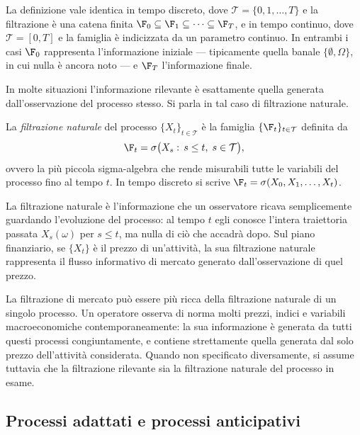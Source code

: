 La definizione vale identica in tempo discreto, dove
$\mathcal{T}=\{0,1,\ldots,T\}$ e la filtrazione \`{e} una catena
finita $\F_0\subseteq\F_1\subseteq\cdots\subseteq\F_T$, e in tempo
continuo, dove $\mathcal{T}=[0,T]$ e la famiglia \`{e} indicizzata da
un parametro continuo. In entrambi i casi $\F_0$ rappresenta
l'informazione iniziale --- tipicamente quella banale
$\{\emptyset,\Omega\}$, in cui nulla \`{e} ancora noto --- e $\F_T$
l'informazione finale.

In molte situazioni l'informazione rilevante \`{e} esattamente quella
generata dall'osservazione del processo stesso. Si parla in tal caso
di filtrazione naturale.

\begin{definition}
\label{def:filtrazione-naturale}
La \emph{filtrazione naturale} del processo $\{X_t\}_{t\in\mathcal{T}}$
\`{e} la famiglia $\{\F_t\}_{t\in\mathcal{T}}$ definita da
\[
\F_t=\sigma\bigl(X_s:\,s\leq t,\;s\in\mathcal{T}\bigr),
\]
ovvero la pi\`{u} piccola sigma-algebra che rende misurabili tutte le
variabili del processo fino al tempo $t$. In tempo discreto si scrive
$\F_t=\sigma(X_0,X_1,\ldots,X_t)$.
\end{definition}

La filtrazione naturale \`{e} l'informazione che un osservatore
ricava semplicemente guardando l'evoluzione del processo: al tempo
$t$ egli conosce l'intera traiettoria passata $X_s(\omega)$ per
$s\leq t$, ma nulla di ci\`{o} che accadr\`{a} dopo. Sul piano
finanziario, se $\{X_t\}$ \`{e} il prezzo di un'attivit\`{a}, la sua
filtrazione naturale rappresenta il flusso informativo di mercato
generato dall'osservazione di quel prezzo.

\begin{remark}
La filtrazione di mercato pu\`{o} essere pi\`{u} ricca della
filtrazione naturale di un singolo processo. Un operatore osserva di
norma molti prezzi, indici e variabili macroeconomiche
contemporaneamente: la sua informazione \`{e} generata da tutti questi
processi congiuntamente, e contiene strettamente quella generata dal
solo prezzo dell'attivit\`{a} considerata. Quando non specificato
diversamente, si assume tuttavia che la filtrazione rilevante sia la
filtrazione naturale del processo in esame.
\end{remark}

\subsection{Processi adattati e processi anticipativi}

